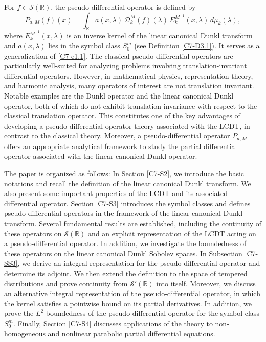 \documentclass[12pt,a4paper,reqno]{amsproc}
\theoremstyle{definition}
\theoremstyle{remark}
\numberwithin{equation}{section}
\begin{document}
For $f\in \mathcal{S}(\mathbb{R})$, the pseudo-differential operator is defined by
\begin{equation*}
 P_{a,M}(f)(x) =  \int_{\mathbb{R}}  a(x,\lambda)\, \mathcal{D}_k^M(f)(\lambda)\, E_k^{M^{-1}}(x,\lambda)\,d\mu_k(\lambda),   
\end{equation*}
where $E_k^{M^{-1}}(x,\lambda)$ is an inverse kernel of the linear canonical Dunkl transform and $a(x,\lambda)$ lies in the symbol class $S_0^m$ (see Definition \ref{C7-D3.1}).
It serves as a generalization of \eqref{C7-e1.1}. The classical pseudo-differential operators are particularly well-suited for analyzing problems involving translation-invariant differential operators. However, in mathematical physics, representation theory, and harmonic analysis, many operators of interest are not translation invariant. Notable examples are the Dunkl operator and the linear canonical Dunkl operator, both of which do not exhibit translation invariance with respect to the classical translation operator.  This constitutes one of the key advantages of developing a pseudo-differential operator theory associated with the LCDT, in contrast to the classical theory.  Moreover, a pseudo-differential operator 
$P_{a,M}$ offers an appropriate analytical framework to study the partial differential operator associated with the linear canonical Dunkl operator.
\par The paper is organized as follows:
In Section \ref{C7-S2}, we introduce the basic notations and recall the definition of the linear canonical Dunkl transform. We also present some important properties of the LCDT and its associated differential operator. Section \ref{C7-S3} introduces the symbol classes and defines pseudo-differential operators in the framework of the linear canonical Dunkl transform. Several fundamental results are established, including the continuity of these operators on $\mathcal{S}(\mathbb{R})$ and an explicit representation of the LCDT acting on a pseudo-differential operator. In addition, we investigate the boundedness of these operators on the linear canonical Dunkl Sobolev spaces. In Subsection \ref{C7-SS3}, we derive an integral representation for the pseudo-differential operator and determine its adjoint. We then extend the definition to the space of tempered distributions and prove continuity from $\mathcal{S}'(\mathbb{R})$ into itself. 
Moreover, we discuss an alternative integral representation of the pseudo-differential operator, in which the kernel satisfies a pointwise bound on its partial derivatives. In addition, we prove the $L^2$ boundedness of the pseudo-differential operator for the symbol class $S^m_0$. Finally, Section \ref{C7-S4} discusses applications of the theory to non-homogeneous and nonlinear parabolic partial differential equations.
\end{document}
